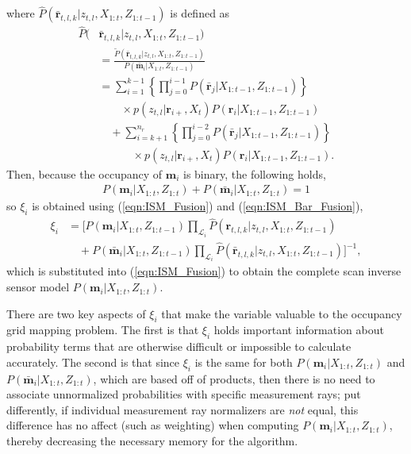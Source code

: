 \documentclass[letterpaper, 10pt, conference]{ieeeconf}
\newcommand{\refeqn}[1]{(\ref{eqn:#1})}
\begin{document}
where $\hat P(\bar{\mathbf{r}}_{t,l,k}|z_{t,l},X_{1:t},Z_{1:t-1})$ is defined as
\begin{align}
\hat P(&\bar{\mathbf{r}}_{t,l,k}|z_{t,l},X_{1:t},Z_{1:t-1})\nonumber\\
&=\frac{\tilde P(\bar{\mathbf{r}}_{t,l,k}|z_{t,l},X_{1:t},Z_{1:t-1})}{P(\bar{\mathbf{m}}_i|X_{1:t},Z_{1:t-1})}
\nonumber\\
&=\sum_{i=1}^{k-1}\left\{\prod_{j=0}^{i-1}P(\bar{\mathbf{r}}_j|X_{1:t-1},Z_{1:t-1})\right\}\nonumber\\&\quad\quad\times p(z_{t,l}|\mathbf{r}_{i+},X_t)P(\mathbf{r}_i|X_{1:t-1},Z_{1:t-1})
\nonumber
\\
&\quad
+
\sum_{i=k+1}^{n_r}\left\{\prod_{j=0}^{i-2}P(\bar{\mathbf{r}}_j|X_{1:t-1},Z_{1:t-1})\right\}\nonumber\\&\quad\qquad\times p(z_{t,l}|\mathbf{r}_{i+},X_t)P(\mathbf{r}_i|X_{1:t-1},Z_{1:t-1}).
\end{align}
Then, because the occupancy of $\mathbf{m}_i$ is binary, the following holds,
\begin{align}
P(\mathbf{m}_i|X_{1:t},Z_{1:t})+P(\bar{\mathbf{m}}_i|X_{1:t},Z_{1:t})=1
\end{align}
so $\xi_i$ is obtained using \refeqn{ISM_Fusion} and \refeqn{ISM_Bar_Fusion},
\begin{align}
\xi_i&=
\bigg[
P(\mathbf{m}_i|X_{1:t},Z_{1:t-1})
\prod_{\mathcal L_i}
\hat P(\mathbf{r}_{t,l,k}|z_{t,l},X_{1:t},Z_{1:t-1})
\nonumber\\&\quad
+
P(\bar{\mathbf{m}}_i|X_{1:t},Z_{1:t-1})
\prod_{\mathcal L_i}
\hat P(\bar{\mathbf{r}}_{t,l,k}|z_{t,l},X_{1:t},Z_{1:t-1})
\bigg]^{-1},
\end{align}
which is substituted into \refeqn{ISM_Fusion} to obtain the complete scan inverse sensor model $P(\mathbf{m}_i|X_{1:t},Z_{1:t})$.

There are two key aspects of $\xi_i$ that make the variable valuable to the occupancy grid mapping problem.
The first is that $\xi_i$ holds important information about probability terms that are otherwise difficult or impossible to calculate accurately.
The second is that since $\xi_i$ is the same for both $P(\mathbf{m}_i|X_{1:t},Z_{1:t})$ and $P(\bar{\mathbf{m}}_i|X_{1:t},Z_{1:t})$, which are based off of products, then there is no need to associate unnormalized probabilities with specific measurement rays; put differently, if individual measurement ray normalizers are \emph{not} equal, this difference has no affect (such as weighting) when computing $P(\mathbf{m}_i|X_{1:t},Z_{1:t})$, thereby decreasing the necessary memory for the algorithm.
\end{document}
